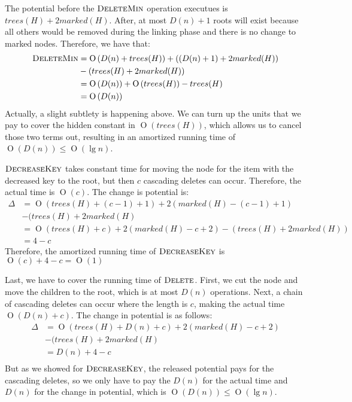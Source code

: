 \documentclass[oneside,11pt,openright]{report}
\newcommand{\BigO}[1]{\ensuremath{\operatorname{O}\left(#1\right)}}
\newcommand{\DeleteMin}{\textsc{DeleteMin}}
\newcommand{\DecreaseKey}{\textsc{DecreaseKey}}
\newcommand{\Delete}{\textsc{Delete}}
\begin{document}
The potential before the $\DeleteMin$ operation executues is $trees(H) + 2marked(H)$. After, at most $D(n) + 1$ roots will exist because all others would be removed during the linking phase and there is no change to marked nodes. Therefore, we have that:
\begin{align*}
    \DeleteMin & = \BigO{D(n) + trees(H)} + \left(\left(D(n) + 1\right) + 2marked(H)\right) \\
    & - \left(trees(H) + 2marked(H)\right) \\
    & = \BigO{D(n)} + \BigO{trees(H)} - trees(H) \\
    & = \BigO{D(n)}
\end{align*}
Actually, a slight subtlety is happening above. We can turn up the units that we pay to cover the hidden constant in $\BigO{trees(H)}$, which allows us to cancel those two terms out, resulting in an amortized running time of $\BigO{D(n)} \le \BigO{\lg n}$.

$\DecreaseKey$ takes constant time for moving the node for the item with the decreased key to the root, but then $c$ cascading deletes can occur. Therefore, the actual time is $\BigO{c}$. The change is potential is:
\begin{align*}
    \Delta & = \BigO{trees(H) + (c - 1) + 1} + 2(marked(H) - (c-1) + 1) \\
    &- (trees(H) + 2marked(H) \\
    & = \BigO{trees(H) + c} + 2(marked(H) - c + 2) - (trees(H) + 2marked(H)) \\
    & = 4 - c
\end{align*}
Therefore, the amortized running time of $\DecreaseKey$ is $\BigO{c} + 4 - c = \BigO{1}$

Last, we have to cover the running time of $\Delete$. First, we cut the node and move the children to the root, which is at most $D(n)$ operations. Next, a chain of cascading deletes can occur where the length is $c$, making the actual time $\BigO{D(n) + c}$. The change in potential is as follows:
\begin{align*}
    \Delta & = \BigO{trees(H) + D(n) + c} + 2(marked(H) - c + 2) \\
    &- (trees(H) + 2marked(H) \\
    & = D(n) + 4 - c \\
\end{align*}
But as we showed for $\DecreaseKey$, the released potential pays for the cascading deletes, so we only have to pay the $D(n)$ for the actual time and $D(n)$ for the change in potential, which is $\BigO{D(n)} \le \BigO{\lg n}$.
\end{document}
